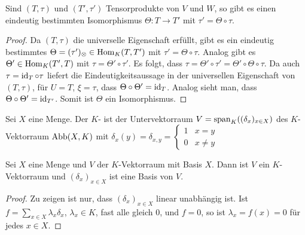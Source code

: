\begin{lemma}
	Sind $(T,\tau)$ und $(T',\tau')$ Tensorprodukte von $V$ und $W$, so gibt es einen eindeutig bestimmten Isomorphismus $\Theta:T\to T'$ mit $\tau'=\Theta\circ\tau$.
	\begin{center}
	\end{center}
\end{lemma}
\begin{proof}
	Da $(T,\tau)$ die universelle Eigenschaft erfüllt, gibt es ein eindeutig bestimmtes $\Theta=(\tau')_\otimes\in\operatorname{Hom}_K(T,T')$ mit $\tau'=\Theta\circ\tau$. Analog gibt es $\Theta'\in\operatorname{Hom}_K(T',T)$ mit $\tau=\Theta'\circ\tau'$. Es folgt, dass $\tau=\Theta'\circ\tau'= \Theta'\circ\Theta\circ\tau$. Da auch $\tau=\operatorname{id}_T\circ\tau$ liefert die Eindeutigkeitsaussage in der universellen Eigenschaft von $(T,\tau)$, für $U=T$, $\xi=\tau$, dass $\Theta\circ\Theta'=\operatorname{id}_T$. Analog sieht man, dass $\Theta\circ\Theta'=\operatorname{id}_{T'}$. Somit ist $\Theta$ ein Isomorphismus.
\end{proof}

\begin{definition}
	Sei $X$ eine Menge. Der $K$- ist der Untervektorraum $V=\operatorname{span}_K((\delta_x)_{x\in X})$ des $K$-Vektorraum $\operatorname{Abb}(X,K)$ mit $\delta_x(y)=\delta_{x,y}=\begin{cases}1&x=y\\0&x\neq y\end{cases}$
\end{definition}

\begin{lemma}
	Sei $X$ eine Menge und $V$ der $K$-Vektorraum mit Basis $X$. Dann ist $V$ ein $K$-Vektorraum und $(\delta_x)_{x\in X}$ ist eine Basis von $V$.
\end{lemma}
\begin{proof}
	Zu zeigen ist nur, dass $(\delta_x)_{x\in X}$ linear unabhängig ist. Ist $f=\sum_{x\in X}\lambda_x \delta_x$, $\lambda_x\in K$, fast alle gleich 0, und $f=0$, so ist $\lambda_x=f(x)=0$ für jedes $x\in X$. 
\end{proof}


